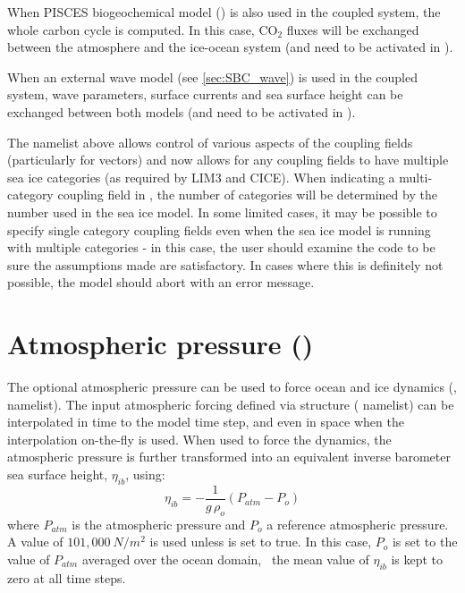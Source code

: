 \documentclass[../main/NEMO_manual]{subfiles}
\begin{document}
When PISCES biogeochemical model () is also used in the coupled system,
the whole carbon cycle is computed.
In this case, CO$_2$ fluxes will be exchanged between the atmosphere and the ice-ocean system
(and need to be activated in  ).


When an external wave model (see \autoref{sec:SBC_wave}) is used in the coupled system, wave parameters, surface currents and sea surface height can be exchanged between both models (and need to be activated in  ).


The namelist above allows control of various aspects of the coupling fields (particularly for vectors) and
now allows for any coupling fields to have multiple sea ice categories (as required by LIM3 and CICE).
When indicating a multi-category coupling field in , the number of categories will be determined by
the number used in the sea ice model.
In some limited cases, it may be possible to specify single category coupling fields even when
the sea ice model is running with multiple categories -
in this case, the user should examine the code to be sure the assumptions made are satisfactory.
In cases where this is definitely not possible, the model should abort with an error message.

\section[Atmospheric pressure (\textit{sbcapr.F90})]{Atmospheric pressure (\protect{})}
\label{sec:SBC_apr}

\begin{listing}
  \caption{}
  \label{lst:namsbc_apr}
\end{listing}

The optional atmospheric pressure can be used to force ocean and ice dynamics
(,  namelist).
The input atmospheric forcing defined via  structure ( namelist)
can be interpolated in time to the model time step, and even in space when the interpolation on-the-fly is used.
When used to force the dynamics, the atmospheric pressure is further transformed into
an equivalent inverse barometer sea surface height, $\eta_{ib}$, using:
\[
  \eta_{ib} = -  \frac{1}{g\,\rho_o}  \left( P_{atm} - P_o \right)
\]
where $P_{atm}$ is the atmospheric pressure and $P_o$ a reference atmospheric pressure.
A value of $101,000~N/m^2$ is used unless  is set to true.
In this case, $P_o$ is set to the value of $P_{atm}$ averaged over the ocean domain,
\ie\ the mean value of $\eta_{ib}$ is kept to zero at all time steps.
\end{document}
